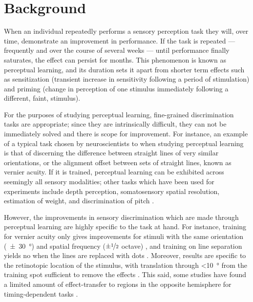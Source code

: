 \section{Background}
\label{sec:pl_bg}
\label{sec:bgpl}

When an individual repeatedly performs a sensory perception task they will, over time, demonstrate an improvement in performance.
If the task is repeated --- frequently and over the course of several weeks --- until performance finally saturates, the effect can persist for months.
This phenomenon is known as perceptual learning, and its duration sets it apart from shorter term effects such as sensitization (transient increase in sensitivity following a period of stimulation) and priming (change in perception of one stimulus immediately following a different, faint, stimulus).

For the purposes of studying perceptual learning, fine-grained discrimination tasks are appropriate; since they are intrinsically difficult, they can not be immediately solved and there is scope for improvement.
For instance, an example of a typical task chosen by neuroscientists to when studying perceptual learning is that of discerning the difference between straight lines of very similar orientations, or the alignment offset between sets of straight lines, known as vernier acuity.
If it is trained, perceptual learning can be exhibited across seemingly all sensory modalities; other tasks which have been used for experiments include depth perception, somatosensory spatial resolution, estimation of weight, and discrimination of pitch \citep{Gilbert1994,Gilbert2001,Dinse2003}.

However, the improvements in sensory discrimination which are made through perceptual learning are highly specific to the task at hand.
For instance, training for vernier acuity only gives improvements for stimuli with the same orientation (\SI{\pm30}{\degree}) and spatial frequency ($\pm\nicefrac{1}{2}$ octave) \citep{Fiorentini1980,Poggio1991}, and training on line separation yields no when the lines are replaced with dots \citep{Poggio1992}.
Moreover, results are specific to the retinotopic location of the stimulus, with translation through \SI{<10}{\degree} from the training spot sufficient to remove the effects \citep{Fiorentini1980,Fiorentini1981,Poggio1991,Karni1991}.
This said, some studies have found a limited amount of effect-transfer to regions in the opposite hemisphere for timing-dependent tasks \citep{Ball1987,Berardi1987}.

